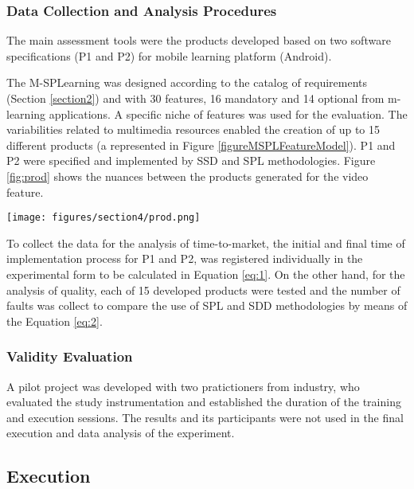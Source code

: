 \subsubsection{Data Collection and Analysis Procedures}

The main assessment tools were the products developed based on two software specifications (P1 and P2) for mobile learning platform (Android).

The M-SPLear\allowbreak ning was designed according to the catalog of requirements (Section \ref{section2}) and with 30 features, 16 mandatory and 14 optional from m-learning applications. A specific niche of features was used for the evaluation. The variabilities related to multimedia resources enabled the creation of up to 15 different products (a represented in Figure \ref{figureMSPLFeatureModel}). P1 and P2 were specified and implemented by SSD and SPL methodologies. Figure \ref{fig:prod} shows the nuances between the products generated for the video feature.


\begin{figure*}
\centering
\texttt{[image: figures/section4/prod.png]}
\centering
\caption{Two Video Products (P1) Developed in the Experimental Execution with a) SPL and b) SDD.}
\label{fig:prod}
\end{figure*}


To collect the data for the analysis of time-to-market, the initial and final time of implementation process for P1 and P2, was registered individually in the experimental form to be calculated in Equation \ref{eq:1}. On the other hand, for the analysis of quality, each of 15 developed products were tested and the number of faults was collect to compare the use of SPL and SDD methodologies by means of the Equation \ref{eq:2}.

\subsubsection{Validity Evaluation}

A pilot project was developed with two pratictioners from industry, who evaluated the study instrumentation and established the duration of the training and execution sessions. The results and its participants were not used in the final execution and data analysis of the experiment.

\subsection{Execution}\label{sub:execution}

